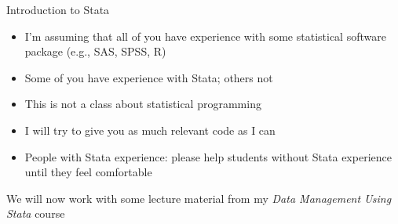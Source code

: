 \begin{frame}{Introduction to Stata}
	
	
	
	\begin{itemize}
		\item I'm assuming that all of you have experience with some statistical software package (e.g., SAS, SPSS, R)
		\item Some of you have experience with Stata; others not
		\item This is not a class about statistical programming
		\item I will try to give you as much relevant code as I can
		\item People with Stata experience: please help students without Stata experience until they feel comfortable
	\end{itemize}
	\vspace{2mm}
	We will now work with some lecture material from my \textit{Data Management Using Stata} course
		
\end{frame}



